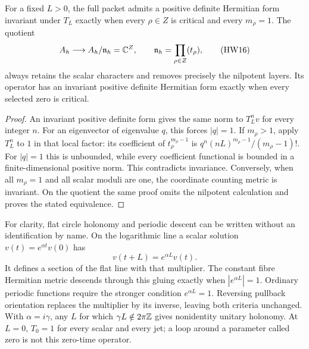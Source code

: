 \begin{proposition}
\label{hw:metricprop}
For a fixed \(L>0\), the full packet admits a positive definite
Hermitian form invariant under \(T_L\) exactly when every
\(\rho\in Z\) is critical and every \(m_\rho=1\).
The quotient
\[
 A_h\longrightarrow A_h/\mathfrak n_h=\mathbb C^Z,\qquad
 \mathfrak n_h=\prod_{\rho\in Z}(t_\rho),
 \tag{HW16}\label{hw:nilquotient}
\]
always retains the scalar characters and removes precisely the
nilpotent layers. Its operator has an invariant positive definite
Hermitian form exactly when every selected zero is critical.
\end{proposition}
\begin{proof}
An invariant positive definite form gives the same norm to
\(T_L^nv\) for every integer \(n\). For an eigenvector of
eigenvalue \(q\), this forces \(|q|=1\).
If \(m_\rho>1\), apply \(T_L^n\) to \(1\) in that local
factor: its coefficient of \(t_\rho^{m_\rho-1}\) is
\(q^n(nL)^{m_\rho-1}/(m_\rho-1)!\).
For \(|q|=1\) this is unbounded, while every coefficient
functional is bounded in a finite-dimensional positive norm.
This contradicts invariance. Conversely, when all \(m_\rho=1\)
and all scalar moduli are one, the coordinate counting metric
is invariant. On the quotient the same proof omits the nilpotent
calculation and proves the stated equivalence.
\end{proof}

For clarity, flat circle holonomy and periodic descent can be
written without an identification by name. On the logarithmic
line a scalar solution \(v(t)=e^{\alpha t}v(0)\) has
\[
 v(t+L)=e^{\alpha L}v(t).
 \tag{HW17}
\]
It defines a section of the flat line with that multiplier.
The constant fibre Hermitian metric descends through this
gluing exactly when \(|e^{\alpha L}|=1\).
Ordinary periodic functions require the stronger condition
\(e^{\alpha L}=1\). Reversing pullback orientation replaces
the multiplier by its inverse, leaving both criteria unchanged.
With \(\alpha=i\gamma\), any \(L\) for which
\(\gamma L\notin2\pi\mathbb Z\) gives nonidentity unitary holonomy.
At \(L=0\), \(T_0=1\) for every scalar and every jet; a loop
around a parameter called zero is not this zero-time operator.

